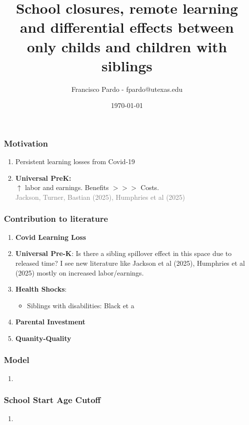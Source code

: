 \documentclass{beamer}
\title[]{School closures, remote learning and differential effects between only childs and children with siblings}
\author[Francisco Pardo] %
{Francisco Pardo - fpardo@utexas.edu \inst{1}}
\institute[UT] %
{
  \inst{1}%
  University of Texas at Austin
}
\date{\today}
\begin{document}
\frame{\titlepage}


\begin{frame}
    \label{update_scott}
    \frametitle{Motivation}
    \begin{enumerate}
        \item Persistent learning losses from Covid-19
        \item \textbf{Universal PreK:} \\
        $\uparrow$ labor and earnings. Benefits $>>>$ Costs. \\
        \small \textcolor{grey}{Jackson, Turner, Bastian (2025), Humphries et al (2025)}
    \end{enumerate}
\end{frame}

\begin{frame}
    \label{update_scott}
    \frametitle{Contribution to literature}
    \begin{enumerate}
        \item \textbf{Covid Learning Loss} \\
        \item \textbf{Universal Pre-K}: Is there a sibling spillover effect in this space due to released time? I see new literature like Jackson et al (2025), Humphries et al (2025) mostly on increased labor/earnings.
        \item \textbf{Health Shocks}: 
        \begin{itemize}
            \item Siblings with disabilities: Black et a
        \end{itemize}
        \item \textbf{Parental Investment} \\
        \item \textbf{Quanity-Quality} \\

    \end{enumerate}
\end{frame}



\begin{frame}
    \label{update_scott}
    \frametitle{Model}
    \begin{enumerate}
        \item 
    \end{enumerate}
\end{frame}

\begin{frame}
    \label{update_scott}
    \frametitle{School Start Age Cutoff}
    \begin{enumerate}
        \item 
    \end{enumerate}
\end{frame}
\end{document}
